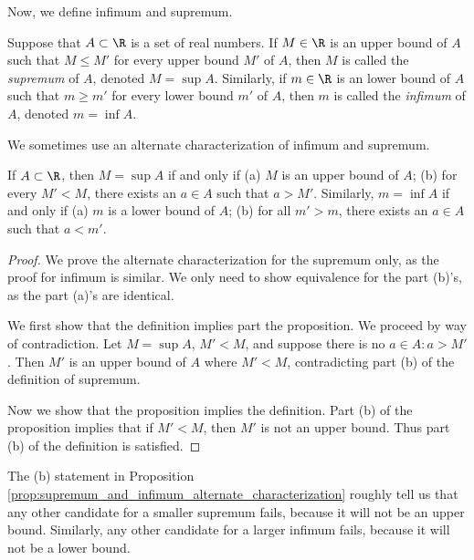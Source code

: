 \documentclass{article} %
\begin{document}
Now, we define infimum and supremum.
\begin{definition}
Suppose that $A \subset \R$ is a set of real numbers. If $M \in \R$ is an upper bound of $A$ such that $M \leq M'$ for every upper bound $M'$ of $A$, then $M$ is called the \textit{supremum} of $A$, denoted $M=\sup A$.   Similarly, if $m \in \R$ is an lower bound of $A$ such that $m \geq m'$ for every lower bound $m'$ of $A$, then $m$ is called the \textit{infimum} of $A$, denoted $m=\inf A$.\label{def:supremum_and_infimum}	
\end{definition}

We sometimes use an alternate characterization of infimum and supremum.

\begin{proposition}

If $A \subset \R$, then $M = \sup A$ if and only if (a) $M$ is an upper bound of $A$; (b) for every $M' < M$, there exists an $a \in A$ such that $a>M'$.  Similarly, $m = \inf A$ if and only if (a) $m$ is a lower bound of $A$; (b) for all $m'>m$, there exists an $a \in A$ such that $a<m'$.
\label{prop:supremum_and_infimum_alternate_characterization}
\end{proposition}

\begin{proof}
We prove the alternate characterization for the supremum only, as the proof for infimum is similar.    We only need to show equivalence for the part (b)'s, as the part (a)'s are identical. 

We first show that the definition implies part the proposition.  We proceed by way of contradiction.  Let $M = \sup A$, $M' <M$, and suppose there is no $a \in A : a > M'$. Then $M'$ is an upper bound of $A$ where $M' <M$, contradicting part (b) of the definition of supremum.   

Now we show that the proposition implies the definition. Part (b) of the proposition implies that if $M' < M$, then $M'$ is not an upper bound. Thus part (b) of the definition is satisfied.
\end{proof}



\begin{remark}
The (b) statement in Proposition \ref{prop:supremum_and_infimum_alternate_characterization} roughly tell us that any other candidate for a smaller supremum fails, because it will not be an upper bound.  Similarly, any other candidate for a larger infimum fails, because it will not be a lower bound. 	
\end{remark}
\end{document}
